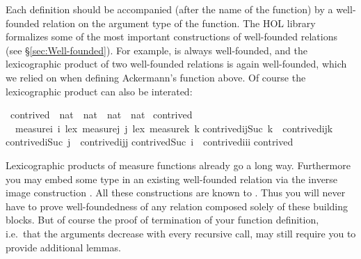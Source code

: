 \begin{isabellebody}
\begin{isamarkuptext}
Each  definition should be accompanied (after the name of
the function) by a well-founded relation on the argument type of the
function.  The HOL library formalizes some of the most important
constructions of well-founded relations (see \S\ref{sec:Well-founded}). For
example,  is always well-founded, and the lexicographic
product of two well-founded relations is again well-founded, which we relied
on when defining Ackermann's function above.
Of course the lexicographic product can also be interated:%
\end{isamarkuptext}%
\ contrived\ {\isacharcolon}{\isacharcolon}\ {\isachardoublequote}nat\ {\isasymtimes}\ nat\ {\isasymtimes}\ nat\ {\isasymRightarrow}\ nat{\isachardoublequote}\isanewline
{}\ contrived\isanewline
\ \ {\isachardoublequote}measure{\isacharparenleft}{\isasymlambda}i{\isachardot}\ i{\isacharparenright}\ {\isacharless}{\isacharasterisk}lex{\isacharasterisk}{\isachargreater}\ measure{\isacharparenleft}{\isasymlambda}j{\isachardot}\ j{\isacharparenright}\ {\isacharless}{\isacharasterisk}lex{\isacharasterisk}{\isachargreater}\ measure{\isacharparenleft}{\isasymlambda}k{\isachardot}\ k{\isacharparenright}{\isachardoublequote}\isanewline
{\isachardoublequote}contrived{\isacharparenleft}i{\isacharcomma}j{\isacharcomma}Suc\ k{\isacharparenright}\ {\isacharequal}\ contrived{\isacharparenleft}i{\isacharcomma}j{\isacharcomma}k{\isacharparenright}{\isachardoublequote}\isanewline
{\isachardoublequote}contrived{\isacharparenleft}i{\isacharcomma}Suc\ j{\isacharcomma}{}{\isacharparenright}\ {\isacharequal}\ contrived{\isacharparenleft}i{\isacharcomma}j{\isacharcomma}j{\isacharparenright}{\isachardoublequote}\isanewline
{\isachardoublequote}contrived{\isacharparenleft}Suc\ i{\isacharcomma}{}{\isacharcomma}{}{\isacharparenright}\ {\isacharequal}\ contrived{\isacharparenleft}i{\isacharcomma}i{\isacharcomma}i{\isacharparenright}{\isachardoublequote}\isanewline
{\isachardoublequote}contrived{\isacharparenleft}{}{\isacharcomma}{}{\isacharcomma}{}{\isacharparenright}\ \ \ \ \ {\isacharequal}\ {}{\isachardoublequote}%
\begin{isamarkuptext}%
Lexicographic products of measure functions already go a long
way. Furthermore you may embed some type in an
existing well-founded relation via the inverse image construction . All these constructions are known to . Thus you
will never have to prove well-foundedness of any relation composed
solely of these building blocks. But of course the proof of
termination of your function definition, i.e.\ that the arguments
decrease with every recursive call, may still require you to provide
additional lemmas.


\end{isamarkuptext}
\end{isabellebody}
